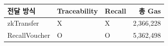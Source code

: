 \begin{tabular}{@{}lllr@{}}\toprule
        \textbf{전달 방식} & \textbf{Traceability} & \textbf{Recall} & \textbf{총 Gas} \\
        \midrule
        zkTransfer     & X                     & X               & 2,366,228      \\
        RecallVoucher  & O                     & O               & 5,362,498      \\
        \bottomrule\end{tabular}

